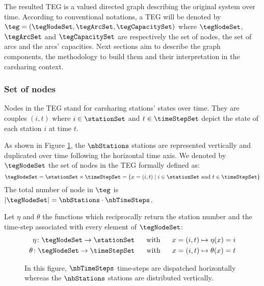 \begin{bibunit}[ieeetr]
The resulted TEG is a valued directed graph describing the original system over time.
According to conventional notations, a TEG will be denoted by $\teg = (\tegNodeSet, \tegArcSet, \tegCapacitySet)$ where $\tegNodeSet$, $\tegArcSet$ and $\tegCapacitySet$ are respectively the set of nodes, the set of arcs and the arcs' capacities.
Next sections aim to describe the graph components, the methodology to build them and their interpretation in the carsharing context.


\subsubsection{Set of nodes}
Nodes in the TEG stand for carsharing stations' states over time.
They are couples $(i,t)$ where $i \in \stationSet$ and $t \in \timeStepSet$ depict the state of each station $i$ at time $t$.

As shown in Figure \ref{fig:tegNodes}, the $\nbStations$ stations are represented vertically and duplicated over time following the horizontal time axis.
We denoted by $\tegNodeSet$ the set of nodes in the TEG formally defined as:
\begin{equation}
\tegNodeSet = \stationSet \times \timeStepSet = \{x=(i,t) \mid i \in \stationSet \text{ and } t \in \timeStepSet\}
\end{equation}
The total number of node in $\teg$ is $|\tegNodeSet| = \nbStations \cdot \nbTimeSteps$.

Let $\eta$ and $\theta$ the functions which reciprocally return the station number and the time-step associated with every element of $\tegNodeSet$:
\begin{align}
\eta \colon \tegNodeSet  \to \stationSet \text{ ~~~~with~~~~ }  x = (i,t) \mapsto \eta(x) = i \\
\theta \colon \tegNodeSet \to \timeStepSet \text{ ~~~~with~~~~ } x = (i,t) \mapsto \theta(x) = t
\end{align} 

\begin{figure}[t] \label{fig:tegNodes}
\begin{minipage}{.65\textwidth}
\begin{center}

\end{center}
\end{minipage}
\begin{minipage}{.3\textwidth}
In this figure, $\nbTimeSteps$ time-steps are dispatched horizontally whereas the $\nbStations$ stations are distributed vertically.


\end{minipage}
\end{figure}
\end{bibunit}
